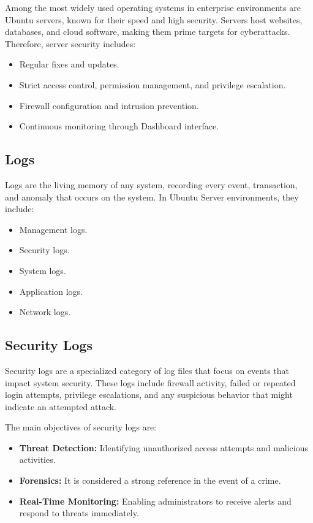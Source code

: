\documentclass[12pt,a4paper]{report} %
\begin{document}
Among the most widely used operating systems in enterprise environments are Ubuntu servers, known for their speed and high security. Servers host websites, databases, and cloud software, making them prime targets for cyberattacks. Therefore, server security includes:
\begin{itemize}[leftmargin=*]
   \item Regular fixes and updates.
   \item Strict access control, permission management, and privilege escalation.
   \item Firewall configuration and intrusion prevention.
   \item Continuous monitoring through Dashboard interface.
\end{itemize}

\subsection{Logs}
Logs are the living memory of any system, recording every event, transaction, and anomaly that occurs on the system. In Ubuntu Server environments, they include:
\begin{itemize}[leftmargin=*]
   \item Management logs.
   \item Security logs.
   \item System logs.
   \item Application logs.
   \item Network logs.
\end{itemize}

\subsection{Security Logs}
Security logs are a specialized category of log files that focus on events that impact system security. These logs include firewall activity, failed or repeated login attempts, privilege escalations, and any suspicious behavior that might indicate an attempted attack.

The main objectives of security logs are:
\begin{itemize}[leftmargin=*]
    \item \textbf{Threat Detection:} Identifying unauthorized access attempts and malicious activities.
    \item \textbf{Forensics:} It is considered a strong reference in the event of a crime.
    \item \textbf{Real-Time Monitoring:} Enabling administrators to receive alerts and respond to threats immediately.
\end{itemize}
\end{document}
